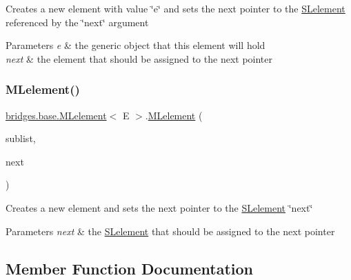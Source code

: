 Creates a new element with value \char`\"{}e\char`\"{} and sets the next pointer to the \mbox{\hyperlink{classbridges_1_1base_1_1_s_lelement}{S\+Lelement}} referenced by the \char`\"{}next\char`\"{} argument


\begin{DoxyParams}{Parameters}
{\em e} & the generic object that this element will hold \\
\hline
{\em next} & the element that should be assigned to the next pointer \\
\hline
\end{DoxyParams}
\mbox{\label{classbridges_1_1base_1_1_m_lelement_aa660281523a7de140a0b17737096a332}} 
\subsubsection{\texorpdfstring{M\+Lelement()}{MLelement()}\hspace{0.1cm}{\footnotesize\ttfamily [4/4]}}
{\footnotesize\ttfamily \mbox{\hyperlink{classbridges_1_1base_1_1_m_lelement}{bridges.\+base.\+M\+Lelement}}$<$ E $>$.\mbox{\hyperlink{classbridges_1_1base_1_1_m_lelement}{M\+Lelement}} (\begin{DoxyParamCaption}\item[{\mbox{\hyperlink{classbridges_1_1base_1_1_m_lelement}{M\+Lelement}}$<$ E $>$}]{sublist,  }\item[{\mbox{\hyperlink{classbridges_1_1base_1_1_m_lelement}{M\+Lelement}}$<$ E $>$}]{next }\end{DoxyParamCaption})}

Creates a new element and sets the next pointer to the \mbox{\hyperlink{classbridges_1_1base_1_1_s_lelement}{S\+Lelement}} \char`\"{}next\char`\"{} 
\begin{DoxyParams}{Parameters}
{\em next} & the \mbox{\hyperlink{classbridges_1_1base_1_1_s_lelement}{S\+Lelement}} that should be assigned to the next pointer \\
\hline
\end{DoxyParams}


\subsection{Member Function Documentation}
\mbox{\label{classbridges_1_1base_1_1_m_lelement_aa2e26697e2c70a36b8345a324d00679a}} 
